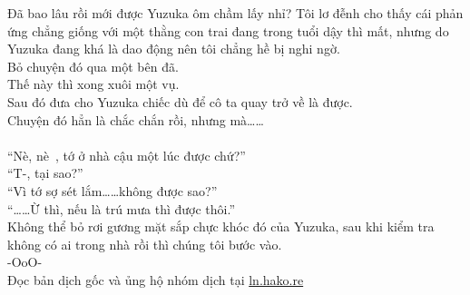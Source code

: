 \documentclass[12pt,a4paper, twosides]{book}
\begin{document}
Đã bao lâu rồi mới được Yuzuka ôm chầm lấy nhỉ? Tôi lơ đễnh cho thấy cái phản ứng chẳng giống với một thằng con trai đang trong tuổi dậy thì mất, nhưng do Yuzuka đang khá là dao động nên tôi chẳng hề bị nghi ngờ.\\
Bỏ chuyện đó qua một bên đã.\\
Thế này thì xong xuôi một vụ.\\
Sau đó đưa cho Yuzuka chiếc dù để cô ta quay trở về là được.\\
Chuyện đó hẳn là chắc chắn rồi, nhưng mà……\\
\\
“Nè, nè~, tớ ở nhà cậu một lúc được chứ?”\\
“T-, tại sao?”\\
“Vì tớ sợ sét lắm……không được sao?”\\
“……Ừ thì, nếu là trú mưa thì được thôi.”\\
Không thể bỏ rơi gương mặt sắp chực khóc đó của Yuzuka, sau khi kiểm tra không có ai trong nhà rồi thì chúng tôi bước vào.\\
-OoO-\\
Đọc bản dịch gốc và ủng hộ nhóm dịch tại \href{https://ln.hako.re/}{ln.hako.re}\\
\newpage
\end{document}
